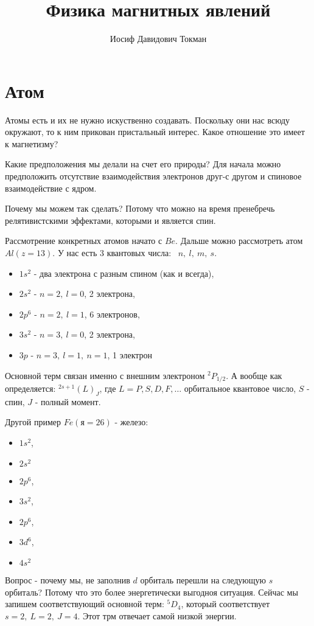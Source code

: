 \documentclass[a4paper, 14pt, russian]{article}
\title{Физика магнитных явлений}
\author{Иосиф Давидович Токман}
\date{}
\begin{document}
	\maketitle

	\section{Атом}

	Атомы есть и их не нужно искуственно создавать. Поскольку они нас всюду окружают, то 
	к ним прикован пристальный интерес. Какое отношение это имеет к магнетизму?

	Какие предположения мы делали на счет его природы? Для начала можно предположить 
	отсутствие взаимодействия электронов друг-с другом и спиновое взаимодействие с ядром.

	Почему мы можем так сделать? Потому что можно на время пренебречь релятивистскими
	эффектами, которыми и является спин.

	Рассмотрение конкретных атомов начато с $Be$. Дальше можно рассмотреть 
	атом $Al(z = 13)$. У нас есть 3 квантовых числа:  $n,~l,~m,~s$.
	\begin{itemize}
		\item $1s^2$ - два электрона с разным спином (как и всегда),
		\item $2s^2$ - $n=2,~l=0$, 2 электрона,
		\item $2p^6$ - $n=2,~l=1$, 6 электронов,
		\item $3s^2$ - $n=3,~l=0$, 2 электрона,
		\item $3p$ - $n=3,~l=1,~n=1$, 1 электрон
	\end{itemize}

	Основной терм связан именно с внешним электроном ${}^2 P_{1/2}$.
	А вообще как определяется: ${}^{2s+1} (L)_{J}$, где $L=P,S,D,F,\hdots$
	орбитальное квантовое число, $S$ - спин, $J$ - полный момент.

	Другой пример $Fe(я = 26)$ - железо:
	\begin{itemize}
		\item $1s^2$,
		\item $2s^2$
		\item $2p^6$,
		\item $3s^2$,
		\item $2p^6$,
		\item $3d^6$,
		\item $4s^2$
	\end{itemize}

	Вопрос - почему мы, не заполнив $d$ орбиталь перешли на следующую $s$ орбиталь?
	Потому что это более энергетически выгодноя ситуация. Сейчас мы запишем
	соответствующий основной терм: ${}^5 D_4$, который соответствует 
	$s = 2,~L = 2,~J=4$. Этот трм отвечает самой низкой энергии.
\end{document}
